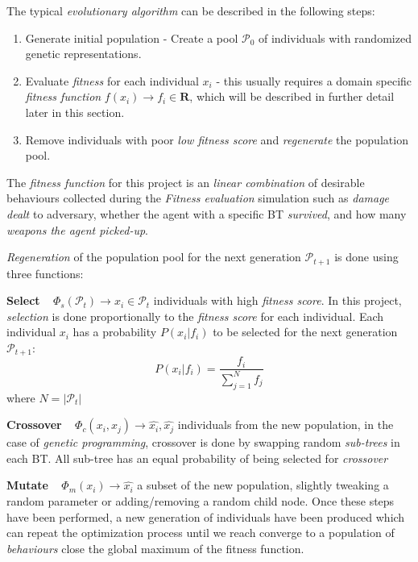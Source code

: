 \documentclass[a4paper, twocolumn]{article}
\begin{document}
	The typical \emph{evolutionary algorithm} can be described in the following steps:
    \begin{enumerate}
        \item Generate initial population - Create a pool \(\mathcal{P_0}\) of individuals with randomized genetic representations.
        \item Evaluate \emph{fitness} for each individual \(x_i\) - this usually requires a domain specific \emph{fitness function} \(f(x_i)\rightarrow f_i \in \mathbf{R}\), which will be described in further detail later in this section.
        \item Remove individuals with poor \textit{low fitness score} and \emph{regenerate} the population pool.
    \end{enumerate}

    The \emph{fitness function} for this project is an \emph{linear combination} of desirable behaviours collected during the \emph{Fitness evaluation} simulation such as \emph{damage dealt} to adversary, whether the agent with a specific BT \emph{survived}, and how many \emph{weapons the agent picked-up}. 

	\emph{Regeneration} of the population pool for the next generation \(\mathcal{P}_{t+1}\) is done using three functions:

    \textbf{Select} ~ \(\Phi_s(\mathcal{P}_t) \rightarrow x_i \in \mathcal{P}_t\) individuals with high \emph{fitness score}. In this project, \emph{selection} is done proportionally to the \emph{fitness score} for each individual. Each individual \(x_i\) has a probability \(P(x_i|f_i)\) to be selected for the next generation \(\mathcal{P}_{t+1}\):
    \begin{equation*}
        P(x_i|f_i) = \frac{f_i}{\sum_{j = 1}^{N}f_j}
    \end{equation*}
    where \(N = |\mathcal{P}_t|\)

    \textbf{Crossover} ~ \(\Phi_c(x_i,x_j) \rightarrow \hat{x_i},\hat{x_j}\) individuals from the new population, in the case of \emph{genetic programming}, crossover is done by swapping random \emph{sub-trees} in each BT. All sub-tree has an equal probability of being selected for \emph{crossover}

    \textbf{Mutate} ~ \(\Phi_m(x_i) \rightarrow \hat{x_i}\) a subset of the new population, slightly tweaking a random parameter or adding/removing a random child node. Once these steps have been performed, a new generation of individuals have been produced which can repeat the optimization process until we reach converge to a population of \emph{behaviours} close the global maximum of the fitness function.
\end{document}

